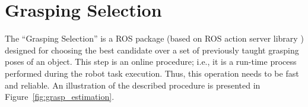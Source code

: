 

\section{Grasping Selection}
\label{cap4:modular_grasping_architecture:sec:grasp_selection}

The ``Grasping Selection'' is a \ac{ROS} package (based on \ac{ROS} action server library \cite{ros_action_lib}) designed for choosing the best candidate over a set of previously taught grasping poses of an object. This step is an online procedure; i.e., it is a run-time process performed during the robot task execution. Thus, this operation needs to be fast and reliable. An illustration of the described procedure is presented in Figure~\ref{fig:grasp_estimation}. 

\begin{figure}[h!]
\end{figure}


